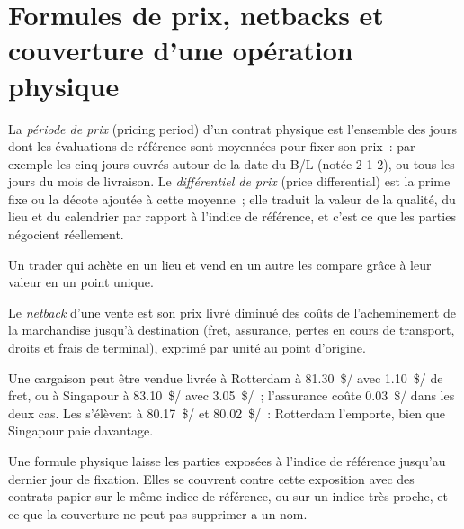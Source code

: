 \section{Formules de prix, netbacks et couverture d'une opération physique}

\begin{definition}\label{def:m3:physical-commodity-markets:formula}
La \emph{période de prix} (pricing period) d'un contrat physique est l'ensemble des
jours dont les évaluations de référence sont moyennées pour fixer son prix~: par exemple les cinq
jours ouvrés autour de la date du B/L (notée 2-1-2), ou tous les jours du
mois de livraison. Le \emph{différentiel de prix} (price differential) est la prime fixe
ou la décote ajoutée à cette moyenne~; elle traduit la valeur de la qualité, du lieu et
du calendrier par rapport à l'indice de référence, et c'est ce que les parties négocient réellement.
\end{definition}

Un trader qui achète en un lieu et vend en un autre les compare grâce à leur
valeur en un point unique.

\begin{definition}[Netback]\label{def:m3:physical-commodity-markets:netback}
Le \emph{netback} d'une vente est son prix livré diminué des coûts de
l'acheminement de la marchandise jusqu'à destination (fret, assurance, pertes en cours de transport, droits et
frais de terminal), exprimé par unité au point d'origine.
\end{definition}

\begin{example}\label{ex:m3:physical-commodity-markets:netback}
Une cargaison peut être vendue livrée à Rotterdam à \qty{81.30}{\$/\barrel} avec
\qty{1.10}{\$/\barrel} de fret, ou à Singapour à \qty{83.10}{\$/\barrel} avec
\qty{3.05}{\$/\barrel}~; l'assurance coûte \qty{0.03}{\$/\barrel} dans les deux cas. Les
 s'élèvent à \qty{80.17}{\$/\barrel} et \qty{80.02}{\$/\barrel}~: Rotterdam l'emporte, bien
que Singapour paie davantage.
\end{example}

Une formule physique laisse les parties exposées à l'indice de référence jusqu'au
dernier jour de fixation. Elles se couvrent contre cette exposition avec des contrats papier sur le même indice de référence, ou sur un
indice très proche, et ce que la couverture ne peut pas supprimer a un nom.

